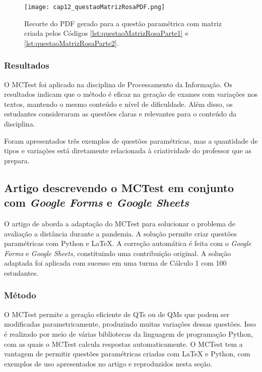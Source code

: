 \begin{figure}[!ht]
  \texttt{[image: cap12\_questaoMatrizRosaPDF.png]}
  \caption{Recorte do PDF gerado para a questão paramétrica com matriz criada pelos Códigos \ref{lst:questaoMatrizRosaParte1} e \ref{lst:questaoMatrizRosaParte2}.}
  \label{fig:cap12_questaoMatrizRosaPDF}
\end{figure}

\subsubsection{Resultados}

O MCTest foi aplicado na disciplina de Processamento da Informação. Os resultados indicam que o método é eficaz na geração de exames com variações nos textos, mantendo o mesmo conteúdo e nível de dificuldade. Além disso, os estudantes consideraram as questões claras e relevantes para o conteúdo da disciplina.

Foram apresentados três exemplos de questões paramétricas, mas a quantidade de tipos e variações está diretamente relacionada à criatividade do professor que as prepara.

\subsection{Artigo descrevendo o MCTest em conjunto com \textit{Google Forms} e \textit{Google Sheets}}\label{sec:experMCTestForms}


O artigo de  aborda a adaptação do MCTest para solucionar o problema de avaliação a distância durante a pandemia. A solução permite criar questões paramétricas com Python e \LaTeX. A correção automática é feita com o \textit{Google Forms} e \textit{Google Sheets}, constituindo uma contribuição original. A solução adaptada foi aplicada com sucesso em uma turma de Cálculo 1 com 100 estudantes.

\subsubsection{Método}

O MCTest permite a geração eficiente de QTs ou de QMs que podem ser modificadas parametricamente, produzindo muitas variações dessas questões. Isso é realizado por meio de várias bibliotecas da linguagem de programação Python, com as quais o MCTest calcula respostas automaticamente. O MCTest tem a vantagem de permitir questões paramétricas criadas com \LaTeX{} e Python, com exemplos de uso apresentados no artigo e reproduzidos nesta seção.

